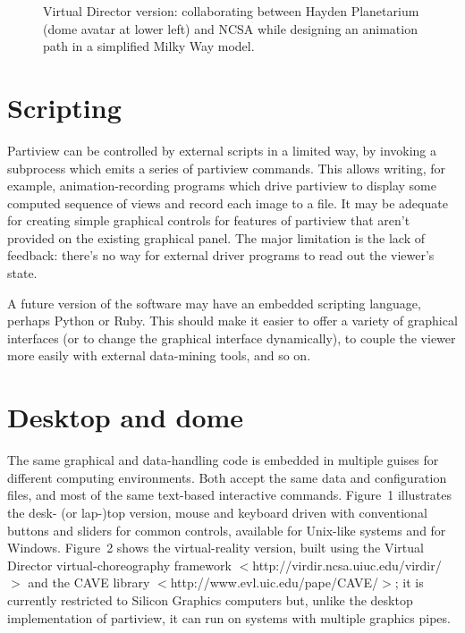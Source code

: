 \begin{figure}[htb]
  \caption{Virtual Director version: collaborating between
    Hayden Planetarium (dome avatar at lower left) and NCSA while
    designing an animation path in a simplified Milky Way model.}
\end{figure}

\section{Scripting}

Partiview can be controlled by external scripts in a limited way,
by invoking a subprocess which emits a series of partiview commands.
This allows writing, for example, animation-recording programs which
drive partiview to display some computed sequence of views and record
each image to a file.  It may be adequate for creating simple
graphical controls for features of partiview that aren't
provided on the existing graphical panel.  The major limitation
is the lack of feedback: there's no way for external driver programs
to read out the viewer's state.

A future version of the software may have an embedded scripting language,
perhaps Python or Ruby.  This should make it easier to offer a variety
of graphical interfaces (or to change the graphical interface dynamically),
to couple the viewer more easily with external data-mining tools, and so on.

\section{Desktop and dome}

The same graphical and data-handling code is embedded
in multiple guises for different computing environments.
Both accept the same data and configuration files, and most of the same
text-based interactive commands.  Figure~1 illustrates the
desk- (or lap-)top version, mouse and keyboard driven
with conventional buttons and sliders for common controls,
available for Unix-like systems and for Windows.
Figure~2 shows the virtual-reality version,
built using the Virtual Director virtual-choreography framework
$<$http://virdir.ncsa.uiuc.edu/virdir/$>$ 
and the CAVE library $<$http://www.evl.uic.edu/pape/CAVE/$>$;
it is currently restricted to Silicon Graphics computers
but, unlike the desktop implementation of partiview,
it can run on systems with multiple graphics pipes.

